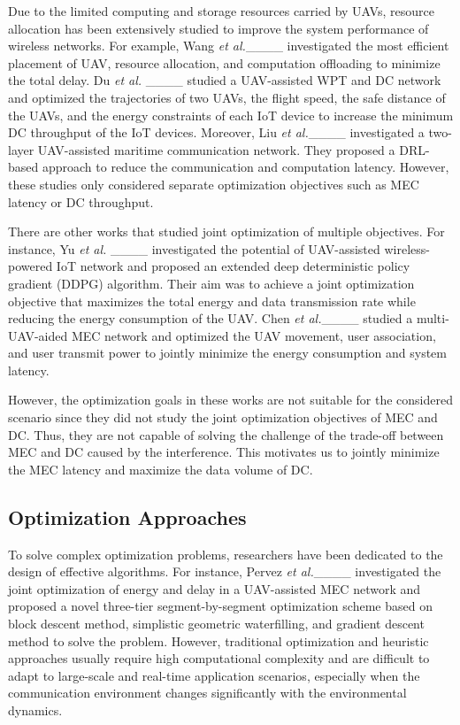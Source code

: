 \par Due to the limited computing and storage resources carried by UAVs, resource allocation has been extensively studied to improve the system performance of wireless networks. For example, Wang \textit{et al.}____ investigated the most efficient placement of UAV, resource allocation, and computation offloading to minimize the total delay. Du \textit{et al.} ____ studied a UAV-assisted WPT and DC network and optimized the trajectories of two UAVs, the flight speed, the safe distance of the UAVs, and the energy constraints of each IoT device to increase the minimum DC throughput of the IoT devices. Moreover, Liu \textit{et al.}____ investigated a two-layer UAV-assisted maritime communication network. They proposed a DRL-based approach to reduce the communication and computation latency. However, these studies only considered separate optimization objectives such as MEC latency or DC throughput. 

\par There are other works that studied joint optimization of multiple objectives. For instance, Yu \textit{et al.} ____ investigated the potential of UAV-assisted wireless-powered IoT network and proposed an extended deep deterministic policy gradient (DDPG) algorithm. Their aim was to achieve a joint optimization objective that maximizes the total energy and data transmission rate while reducing the energy consumption of the UAV. Chen \textit{et al.}____ studied a multi-UAV-aided MEC network and optimized the UAV movement, user association, and user transmit power to jointly minimize the energy consumption and system latency.

\par However, the optimization goals in these works are not suitable for the considered scenario since they did not study the joint optimization objectives of MEC and DC. Thus, they are not capable of solving the challenge of the trade-off between MEC and DC caused by the interference. This motivates us to jointly minimize the MEC latency and maximize the data volume of DC.


\subsection{Optimization Approaches}

\par To solve complex optimization problems, researchers have been dedicated to the design of effective algorithms. For instance, Pervez \textit{et al.}____ investigated the joint optimization of energy and delay in a UAV-assisted MEC network and proposed a novel three-tier segment-by-segment optimization scheme based on block descent method, simplistic geometric waterfilling, and gradient descent method to solve the problem. However, traditional optimization and heuristic approaches usually require high computational complexity and are difficult to adapt to large-scale and real-time application scenarios, especially when the communication environment changes significantly with the environmental dynamics.

